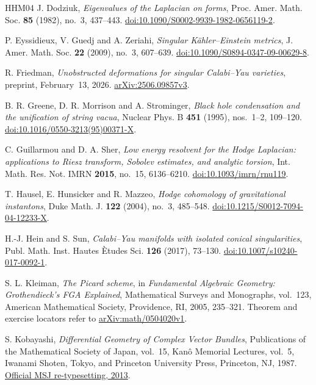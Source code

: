 \begin{thebibliography}{HHM04}
J. Dodziuk,
\emph{Eigenvalues of the Laplacian on forms},
Proc. Amer. Math. Soc. \textbf{85} (1982), no.~3, 437--443.
\href{https://doi.org/10.1090/S0002-9939-1982-0656119-2}{doi:10.1090/S0002-9939-1982-0656119-2}.

P. Eyssidieux, V. Guedj and A. Zeriahi,
\emph{Singular K\"ahler--Einstein metrics},
J. Amer. Math. Soc. \textbf{22} (2009), no.~3, 607--639.
\href{https://doi.org/10.1090/S0894-0347-09-00629-8}{doi:10.1090/S0894-0347-09-00629-8}.

R. Friedman,
\emph{Unobstructed deformations for singular Calabi--Yau varieties},
preprint, February~13, 2026.
\href{https://arxiv.org/abs/2506.09857v3}{arXiv:2506.09857v3}.

B. R. Greene, D. R. Morrison and A. Strominger,
\emph{Black hole condensation and the unification of string vacua},
Nuclear Phys. B \textbf{451} (1995), nos.~1--2, 109--120.
\href{https://doi.org/10.1016/0550-3213(95)00371-X}{doi:10.1016/0550-3213(95)00371-X}.

C. Guillarmou and D. A. Sher,
\emph{Low energy resolvent for the Hodge Laplacian: applications to
Riesz transform, Sobolev estimates, and analytic torsion},
Int. Math. Res. Not. IMRN \textbf{2015}, no.~15, 6136--6210.
\href{https://doi.org/10.1093/imrn/rnu119}{doi:10.1093/imrn/rnu119}.

T. Hausel, E. Hunsicker and R. Mazzeo,
\emph{Hodge cohomology of gravitational instantons},
Duke Math. J. \textbf{122} (2004), no.~3, 485--548.
\href{https://doi.org/10.1215/S0012-7094-04-12233-X}{doi:10.1215/S0012-7094-04-12233-X}.

H.-J. Hein and S. Sun,
\emph{Calabi--Yau manifolds with isolated conical singularities},
Publ. Math. Inst. Hautes \`Etudes Sci. \textbf{126} (2017), 73--130.
\href{https://doi.org/10.1007/s10240-017-0092-1}{doi:10.1007/s10240-017-0092-1}.

S. L. Kleiman,
\emph{The Picard scheme},
in \emph{Fundamental Algebraic Geometry: Grothendieck's FGA Explained},
Mathematical Surveys and Monographs, vol.~123,
American Mathematical Society, Providence, RI, 2005, 235--321.
Theorem and exercise locators refer to
\href{https://arxiv.org/abs/math/0504020v1}{arXiv:math/0504020v1}.

S. Kobayashi,
\emph{Differential Geometry of Complex Vector Bundles},
Publications of the Mathematical Society of Japan, vol.~15,
Kan\^o Memorial Lectures, vol.~5,
Iwanami Shoten, Tokyo, and Princeton University Press, Princeton, NJ, 1987.
\href{https://www.mathsoc.jp/assets/pdf/publications/pubmsj/Vol15.pdf}{Official MSJ re-typesetting, 2013}.


\end{thebibliography}
